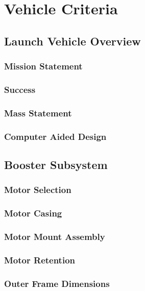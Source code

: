 \chapter{Vehicle Criteria}

\section{Launch Vehicle Overview}
    
    \subsection{Mission Statement}
    

    \subsection{Success}
    

    \subsection{Mass Statement}
    

    \subsection{Computer Aided Design}
    

\section{Booster Subsystem}

    \subsection{Motor Selection}


    \subsection{Motor Casing}


    \subsection{Motor Mount Assembly}


    \subsection{Motor Retention}


    \subsection{Outer Frame Dimensions}


